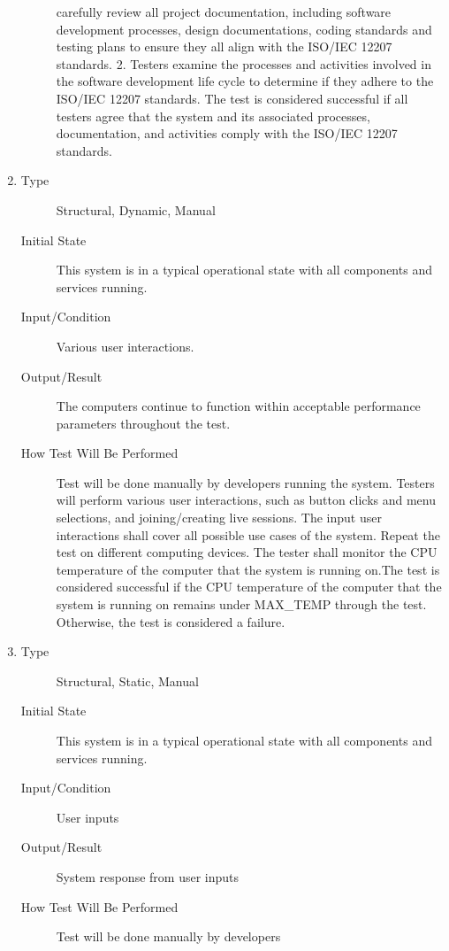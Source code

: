 \documentclass[12pt, titlepage]{article}
\begin{document}
\begin{enumerate}[NFR-T1]
\begin{description}
    carefully review all project documentation, including software development
    processes, design documentations, coding standards and testing plans to
    ensure they all align with the ISO/IEC 12207 standards. 2. Testers examine
    the processes and activities involved in the software development life cycle
    to determine if they adhere to the ISO/IEC 12207 standards. The test is
    considered successful if all testers agree that the system and its
    associated processes, documentation, and activities comply with the ISO/IEC
    12207 standards.
  \end{description}
\item \label{NFRT29}
  \begin{description}
  \item[Type] Structural, Dynamic, Manual
  \item[Initial State] This system is in a typical operational state with all
    components and services running.
  \item[Input/Condition] Various user interactions.
  \item[Output/Result] The computers continue to function within acceptable
    performance parameters throughout the test.
  \item[How Test Will Be Performed] Test will be done manually by developers
    running the system. Testers will perform various user interactions, such as
    button clicks and menu selections, and joining/creating live sessions. The
    input user interactions shall cover all possible use cases of the system.
    Repeat the test on different computing devices. The tester shall monitor the
    CPU temperature of the computer that the system is running on.The test is
    considered successful if the CPU temperature of the computer that the system
    is running on remains under MAX\_TEMP through the test. Otherwise,
    the test is considered a failure.
  \end{description}
\item \label{NFRT30}
  \begin{description}
  \item[Type] Structural, Static, Manual
  \item[Initial State] This system is in a typical operational state with all
    components and services running.
  \item[Input/Condition] User inputs
  \item[Output/Result] System response from user inputs
  \item[How Test Will Be Performed] Test will be done manually by developers

\end{description}
\end{enumerate}
\end{document}

